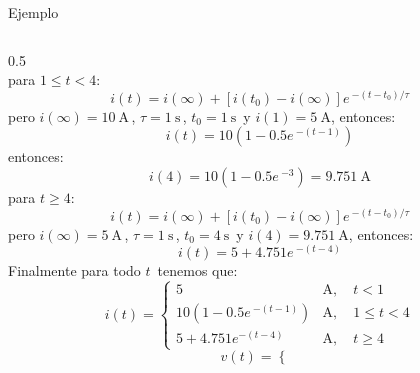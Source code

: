 \documentclass[aspectratio=169]{beamer}
\begin{document}
\begin{frame}{Ejemplo}
\begin{columns}[onlytextwidth]
\begin{column}{0.5\textwidth}
{{\begin{equation*}
            \end{equation*}
            }
        }
            {
            {para $1\leq t < 4$:
            \begin{equation*}
                i(t)= i(\infty) + [i(t_0)-i(\infty)]e\,^{-(t - t_0)/ \tau}          
            \end{equation*}
            }
            {pero $i(\infty) = \SI{10}{\ampere}\,$, $\tau=\SI{1}{\second}\,$, $t_0 = \SI{1}{\second}\,$ y $i(1)=\SI{5}{\ampere}$, entonces: 
            \begin{equation*}
                i(t)=10\left(1-0.5e\,^{-(t - 1)}\right)         
            \end{equation*}
            }
            {entonces: 
            \begin{equation*}
                i(4)=10\left(1-0.5e\,^{-3}\right)=\SI{9.751}{\ampere}      
            \end{equation*}
            }
        }
            {
            {para $t \geq 4$:
            \begin{equation*}
                i(t)= i(\infty) + [i(t_0)-i(\infty)]e\,^{-(t - t_0)/ \tau}          
            \end{equation*}
            }
            {pero $i(\infty) = \SI{5}{\ampere}\,$, $\tau=\SI{1}{\second}\,$, $t_0 = \SI{4}{\second}\,$ y $i(4)=\SI{9.751}{\ampere}$, entonces: 
            \begin{equation*}
                i(t)=5+4.751e\,^{-(t - 4)}        
            \end{equation*}
            }
        }
            {\small{}
            {Finalmente para todo $t\,$ tenemos que:
            \begin{equation*}
                i(t) =
                \begin{cases}
                    5 &\si{\ampere},\quad t < 1\\
                    10\left(1-0.5e\,^{-(t-1)}\right) &\si{\ampere},\quad 1 \leq t < 4\\
                    5+4.751e^{-(t-4)} &\si{\ampere},\quad t \geq 4
                \end{cases}
            \end{equation*}
            }
            {\begin{equation*}
                v(t) =
                \begin{cases}

\end{cases}
\end{equation*}}}
\end{column}
\end{columns}
\end{frame}
\end{document}
